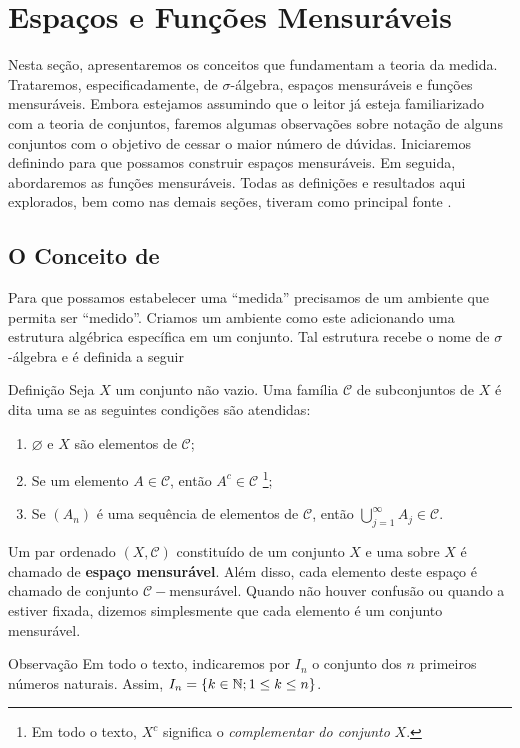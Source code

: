 \chapter{Espaços e Funções Mensuráveis}

Nesta seção, apresentaremos os conceitos que fundamentam a teoria da medida. Trataremos, especificadamente, de $\sigma$-álgebra, espaços mensuráveis e funções mensuráveis. 
Embora estejamos assumindo que o leitor já esteja familiarizado com a teoria de conjuntos, faremos algumas observações sobre notação de alguns conjuntos com o objetivo de cessar o maior número de dúvidas.
Iniciaremos definindo \sigal para que possamos construir espaços mensuráveis.
Em seguida, abordaremos as funções mensuráveis.
Todas as definições e resultados aqui explorados, bem como nas demais seções,  tiveram como principal fonte \cite{bartle}.

\section{O Conceito de \sigal}
Para que possamos estabelecer uma \enquote{medida} precisamos de um ambiente que permita ser \enquote{medido}. 
Criamos um ambiente como este adicionando uma estrutura algébrica específica em um conjunto.
Tal estrutura recebe o nome de $\sigma$-álgebra e é definida a seguir
\begin{resultado}{Definição}
\label{def:sigma-algebra}
    Seja $X$ um conjunto não vazio. Uma família $\mathcal{C}$ de subconjuntos de $X$ é dita uma \sigal se as seguintes condições são atendidas:
    \begin{enumerate}[label*= (\roman*)]
        \item $\varnothing$ e $X$ são elementos de $\mathcal{C}$;     
        \item Se um elemento $A \in \mathcal{C}$, então $A^c \in \mathcal{C}$
        \footnote{Em todo o texto, $X^c$ significa o \textit{complementar do conjunto} $X$.};
        \item Se $(A_n)$ é uma sequência de elementos de $\mathcal{C}$, 
        então $\displaystyle \bigcup_{j = 1}^\infty A_j \in \mathcal{C}$.
    \end{enumerate}

\end{resultado}

Um par ordenado $(X, \mathcal{C})$  constituído de um conjunto $X$ e uma \sigal sobre $X$ é chamado de  \textbf{espaço mensurável}. 
Além disso, cada elemento deste espaço é chamado de conjunto $\mathcal{C}-$mensurável.
Quando não houver confusão ou quando a \sigal estiver fixada, dizemos simplesmente que cada elemento é um conjunto mensurável.
\begin{resultado}{Observação}
	Em todo o texto, indicaremos por $I_n$ o conjunto dos $n$ primeiros números naturais. 
	Assim, $I_n = \{k \in \operatorname{\mathbb{N}}; 1 \leq k \leq n\}$.
\end{resultado}

